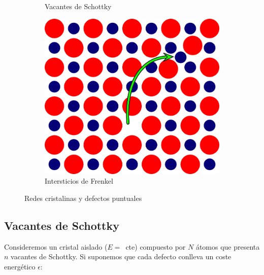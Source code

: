 \documentclass[a4paper,11pt]{article}
\begin{document}
\begin{figure}[t]
\begin{subfigure}[b]{0.3\textwidth}
        \caption{Vacantes de Schottky}
        \label{fig:schottky}
    \end{subfigure}
    \begin{subfigure}[b]{0.27\textwidth}
        \includegraphics[width=\textwidth]{figs/frenkel.png}
        \caption{Intersticios de Frenkel}
        \label{fig:frenkel}
    \end{subfigure}
    \caption{Redes cristalinas y defectos puntuales}
\end{figure}


\subsection*{Vacantes de Schottky}

Consideremos un cristal aislado ($E = $~cte) compuesto por $N$ átomos
que presenta $n$ vacantes de Schottky.
Si suponemos que cada defecto conlleva un coste energético $\epsilon$:
\end{document}
